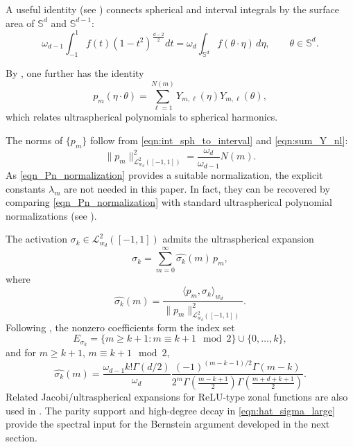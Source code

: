 \documentclass{article}
\numberwithin{equation}{section}
\def\SS{\mathbb{S}}
\begin{document}
A useful identity (see \cite[Lemma~A.5.2]{dai2013approximation}) connects spherical and interval integrals by the surface area of $\SS^d$ and $\SS^{d-1}$:
\begin{equation}\label{eqn:int_sph_to_interval}
    \omega_{d-1}\int_{-1}^1 f(t)(1-t^2)^{\frac{d-2}{2}}dt
    = \omega_d \int_{\mathbb{S}^d} f(\theta\cdot \eta)\, d\eta,
    \qquad \theta \in \mathbb{S}^d.
\end{equation}

By \cite[Theorem~1.2.6]{dai2013approximation}, one further has the identity
\begin{equation}\label{eqn:sum_Y_nl}
    p_m(\eta\cdot \theta)
    = \sum_{\ell=1}^{N(m)} Y_{m,\ell}(\eta) Y_{m,\ell}(\theta),
\end{equation}
which relates ultraspherical polynomials to spherical harmonics.

The norms of $\{p_m\}$ follow from \eqref{eqn:int_sph_to_interval} and \eqref{eqn:sum_Y_nl}:
\begin{equation}\label{eqn_Pn_normalization}
    \|p_m\|_{\mathcal{L}^2_{w_d}([-1,1])}^2
    = \frac{\omega_d}{\omega_{d-1}} N(m).
\end{equation}
As \eqref{eqn_Pn_normalization} provides a suitable normalization, the explicit constants $\lambda_m$ are not needed in this paper. In fact, they can be recovered by comparing \eqref{eqn_Pn_normalization} with standard ultraspherical polynomial normalizations 
(see \cite[Chap.~4.3]{szego1975orthogonal}).

\medskip

The activation $\sigma_k \in \mathcal{L}^2_{w_d}([-1,1])$ admits the ultraspherical expansion
\begin{equation}\label{eqn:ultraspherical_expansion_ReLUk}
    \sigma_k = \sum_{m=0}^\infty \widehat{\sigma_k}(m)\, p_m,
\end{equation}
where
\[
    \widehat{\sigma_k}(m)
    = \frac{\langle p_m, \sigma_k\rangle_{w_d}}
           {\|p_m\|_{\mathcal{L}^2_{w_d}([-1,1])}^2}.
\]
Following \cite{schneider1967problem,bourgain2006projection,mhaskar2006weighted,bach2017breaking}, 
the nonzero coefficients form the index set
\[
    E_{\sigma_k} = 
    \{m \ge k+1 : m\equiv k+1\mod2\} \cup \{0,\ldots,k\},
\]
and for $m\geq k+1$, $m\equiv k+1\mod2$,
\begin{equation}\label{eqn:hat_sigma_large}
    \widehat{\sigma_k}(m)
    = \frac{\omega_{d-1}k!\Gamma(d/2)}{\omega_d}
      \frac{(-1)^{(m-k-1)/2}\Gamma(m-k)}
           {2^m\Gamma\!\left(\frac{m-k+1}{2}\right)
            \Gamma\!\left(\frac{m+d+k+1}{2}\right)}.
\end{equation}
Related Jacobi/ultraspherical expansions for ReLU-type zonal functions are also used in \cite{mhaskar2019reluZonal}.
The parity support and high-degree decay in \eqref{eqn:hat_sigma_large} provide the spectral input for the Bernstein argument developed in the next section.
\end{document}
